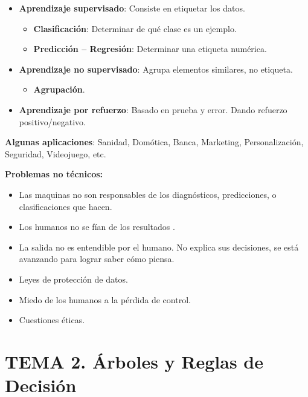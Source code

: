 \documentclass[12pt]{report} %
\begin{document}
\begin{itemize}

\item
  \textbf{Aprendizaje supervisado}: Consiste en etiquetar los datos.

  \begin{itemize}
  
  \item
    \textbf{Clasificación}: Determinar de qué clase es un ejemplo.
    
  \item
    \textbf{Predicción -- Regresión}: Determinar una etiqueta numérica.

  \end{itemize}
\item
  \textbf{Aprendizaje no supervisado}: Agrupa elementos similares, no
  etiqueta.

  \begin{itemize}
  
  \item
    \textbf{Agrupación}.
  \end{itemize}
\item
  \textbf{Aprendizaje por refuerzo}: Basado en prueba y error. Dando
  refuerzo positivo/negativo.
\end{itemize}

\textbf{Algunas aplicaciones}: Sanidad, Domótica, Banca, Marketing,
Personalización, Seguridad, Videojuego, etc.

\textbf{Problemas no técnicos:}

\begin{itemize}
\item
  Las maquinas no son responsables de los diagnósticos, predicciones, o
  clasificaciones que hacen.
\item
  Los humanos no se fían de los resultados .
\item
  La salida no es entendible por el humano. No explica sus decisiones,
  se está avanzando para lograr saber cómo piensa.
\item
  Leyes de protección de datos.
\item
  Miedo de los humanos a la pérdida de control.
\item
  Cuestiones éticas.
\end{itemize}

\chapter{TEMA 2. Árboles y Reglas de
Decisión}
\end{document}
